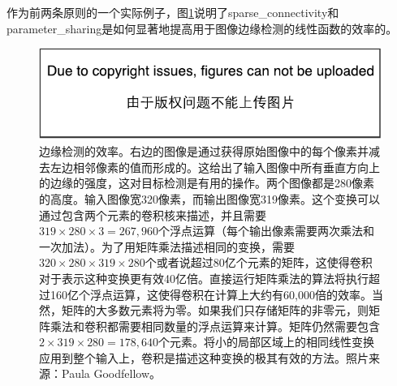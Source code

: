 作为前两条原则的一个实际例子，图\ref{fig:chap9_efficiency_of_edge_detection}说明了\gls{sparse_connectivity}和\gls{parameter_sharing}是如何显著地提高用于图像边缘检测的线性函数的效率的。
\begin{figure}
\ifOpenSource
\centerline{\includegraphics{figure.pdf}}
\else
\centering    
{}     
\fi
\captionsetup{singlelinecheck=off}
\caption{边缘检测的效率。右边的图像是通过获得原始图像中的每个像素并减去左边相邻像素的值而形成的。这给出了输入图像中所有垂直方向上的边缘的强度，这对目标检测是有用的操作。两个图像都是280像素的高度。输入图像宽320像素，而输出图像宽319像素。这个变换可以通过包含两个元素的卷积核来描述，并且需要$319\times 280\times 3 = 267,960$个浮点运算（每个输出像素需要两次乘法和一次加法）。为了用矩阵乘法描述相同的变换，需要$320\times 280\times 319\times 280$个或者说超过80亿个元素的矩阵，这使得卷积对于表示这种变换更有效40亿倍。直接运行矩阵乘法的算法将执行超过160亿个浮点运算，这使得卷积在计算上大约有60,000倍的效率。当然，矩阵的大多数元素将为零。如果我们只存储矩阵的非零元，则矩阵乘法和卷积都需要相同数量的浮点运算来计算。矩阵仍然需要包含$2\times 319\times 280=178,640$个元素。将小的局部区域上的相同线性变换应用到整个输入上，卷积是描述这种变换的极其有效的方法。照片来源：Paula Goodfellow。}   
\label{fig:chap9_efficiency_of_edge_detection}     
\end{figure}
 
